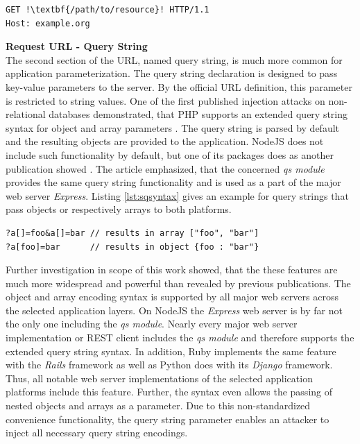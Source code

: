 \begin{lstlisting}[escapechar=!, caption={Example for GET request}, label={lst:http_request_example}]
GET !\textbf{/path/to/resource}! HTTP/1.1
Host: example.org
\end{lstlisting}

\textbf{Request URL - Query String}\\
The second section of the URL, named query string, is much more common for application parameterization. The query string declaration is designed to pass key-value parameters to the server. By the official URL definition, this parameter is restricted to string values. One of the first published injection attacks on non-relational databases demonstrated, that PHP supports an extended query string syntax for object and array parameters \cite{Sullivan:2011}. The query string is parsed by default and the resulting objects are provided to the application. NodeJS does not include such functionality by default, but one of its packages does as another publication showed \cite{Petkov:2014a}. The article emphasized, that the concerned \textit{qs module} provides the same query string functionality and is used as a part of the major web server \textit{Express}. Listing \ref{lst:sqsyntax} gives an example for query strings that pass objects or respectively arrays to both platforms. \\

\begin{lstlisting}[caption={Examples for extended query string syntax}, label={lst:sqsyntax}]
?a[]=foo&a[]=bar // results in array ["foo", "bar"]
?a[foo]=bar      // results in object {foo : "bar"}
\end{lstlisting}

Further investigation in scope of this work showed, that the these features are much more widespread and powerful than revealed by previous publications. The object and array encoding syntax is supported by all major web servers across the selected application layers. On NodeJS the \textit{Express} web server is by far not the only one including the \textit{qs module}. Nearly every major web server implementation or REST client includes the \textit{qs module} and therefore supports the extended query string syntax. In addition, Ruby implements the same feature with the \textit{Rails} framework as well as Python does with its \textit{Django} framework. Thus, all notable web server implementations of the selected application platforms include this feature. Further, the syntax even allows the passing of nested objects and arrays as a parameter. Due to this non-standardized convenience functionality, the query string parameter enables an attacker to inject all necessary query string encodings. \\

